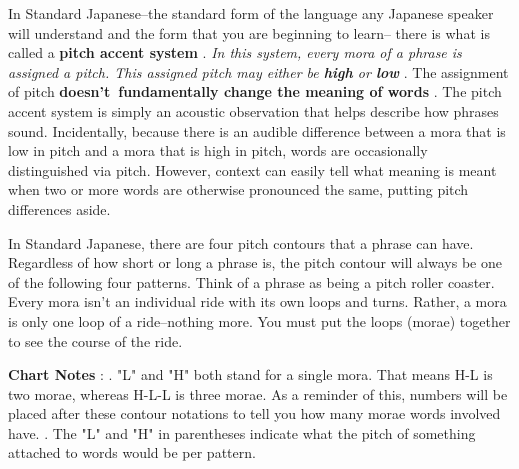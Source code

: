 \par{ In Standard Japanese--the standard form of the language any Japanese speaker will understand and the form that you are beginning to learn-- there is what is called a \textbf{pitch accent system }. \emph{In this system, every mora of a phrase is assigned a pitch. This assigned pitch may either be \textbf{high }or \textbf{low }}. The assignment of pitch \textbf{doesn't fundamentally change the meaning of words }. The pitch accent system is simply an acoustic observation that helps describe how phrases sound. Incidentally, because there is an audible difference between a mora that is low in pitch and a mora that is high in pitch, words are occasionally distinguished via pitch. However, context can easily tell what meaning is meant when two or more words are otherwise pronounced the same, putting pitch differences aside. }

\par{ In Standard Japanese, there are four pitch contours that a phrase can have. Regardless of how short or long a phrase is, the pitch contour will always be one of the following four patterns. Think of a phrase as being a pitch roller coaster. Every mora isn't an individual ride with its own loops and turns. Rather, a mora is only one loop of a ride--nothing more. You must put the loops (morae) together to see the course of the ride. }

\par{\textbf{Chart Notes }: \hfill{}. "L" and "H" both stand for a single mora. That means H-L is two morae, whereas H-L-L is three morae. As a reminder of this, numbers will be placed after these contour notations to tell you how many morae words involved have. \hfill{}. The "L" and "H" in parentheses indicate what the pitch of something attached to words would be per pattern. }

